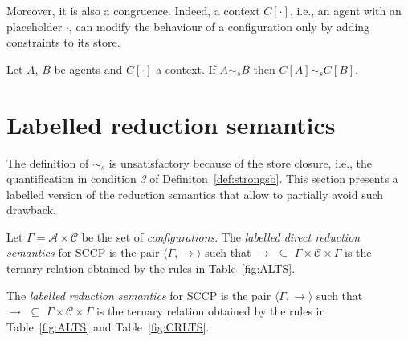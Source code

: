 \documentclass{llncs}
\def\C{{\mathcal C}}
\newcommand{\rarrow}{\rightarrow}
\def\C{{\mathcal C}}
\begin{document}
Moreover, it is also a congruence. Indeed, a context $C[\cdot]$, i.e., an agent with an placeholder $\cdot$,
can modify the behaviour of a configuration only by adding constraints to its store. 

\begin{proposition}
Let $A$, $B$ be agents and $C[\cdot]$ a context.
If $A \sim_{\mathit{s}} B$
then $C[A] \sim_{\mathit{s}} C[B]$.
\end{proposition}



\section{Labelled reduction semantics}\label{sec:labelled}
The definition of $\sim_{\mathit{s}}$ 
is unsatisfactory
because of the store closure, i.e., the quantification in condition \emph{3} of 
Definiton~\ref{def:strongsb}.
This section presents a labelled version of the reduction semantics that 
allow to partially 
avoid such drawback.

\begin{definition}
	Let $\Gamma = {\mathcal A} \times \C$ be the set of \emph{configurations}.
	The  \emph{labelled direct reduction semantics} for SCCP is the pair 
	$\langle \Gamma,   \xrightarrow{ }  \rangle$
	such that $\to \, \, \subseteq \, \,\Gamma \times \mathcal{C} \times \Gamma$ is the ternary
	relation obtained by the rules in Table~\ref{fig:ALTS}.
	
	The \emph{labelled reduction semantics} for SCCP is the pair 
	$\langle \Gamma,  \rightarrow \rangle$
	such that $\rarrow \, \, \subseteq \, \,\Gamma \times \mathcal{C} \times  \Gamma$ is the ternary relation
         obtained by the rules in Table~\ref{fig:ALTS} and Table~\ref{fig:CRLTS}.
\end{definition}
\end{document}
